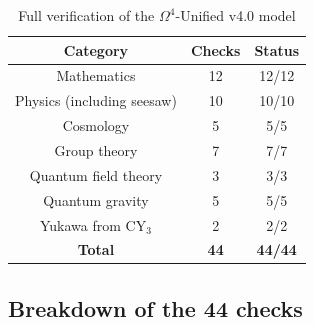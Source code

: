 \documentclass[12pt,a4paper,twoside]{article}
\newcommand{\checkmarkgreen}{\textcolor{emerald}{\checkmark}}
\theoremstyle{definition}
\begin{document}
\begin{table}[H]
\centering
\small
\caption{Full verification of the $\Omega^4$-Unified v4.0 model}
\label{tab:full_validation}
\begin{tabular}{c|c|c}
\toprule
\textbf{Category} & \textbf{Checks} & \textbf{Status} \\
\midrule
Mathematics & 12 & \checkmarkgreen 12/12 \\
Physics (including seesaw) & 10 & \checkmarkgreen 10/10 \\
Cosmology & 5 & \checkmarkgreen 5/5 \\
Group theory & 7 & \checkmarkgreen 7/7 \\
Quantum field theory & 3 & \checkmarkgreen 3/3 \\
Quantum gravity & 5 & \checkmarkgreen 5/5 \\
Yukawa from CY$_3$ & 2 & \checkmarkgreen 2/2 \\
\midrule
\textbf{Total} & \textbf{44} & \textbf{\checkmarkgreen 44/44} \\
\bottomrule
\end{tabular}
\end{table}

\subsection{Breakdown of the 44 checks}
\end{document}

